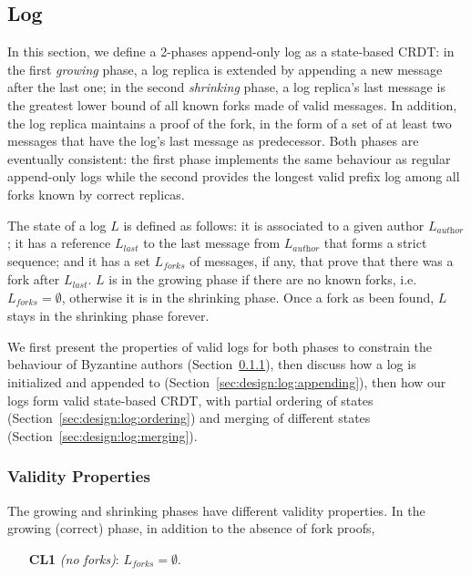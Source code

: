 \documentclass[9pt, oneside]{article}   	%
\begin{document}
\subsection{Log}
\label{sec:design:log}

In this section, we define a 2-phases append-only log as a state-based CRDT: in the first \textit{growing} phase, a log replica is extended by appending a new message after the last one; in the second \textit{shrinking} phase, a log replica's last message is the greatest lower bound of all known forks made of valid messages. In addition, the log replica maintains a proof of the fork, in the form of a set of at least two messages that have the log's last message as predecessor. Both phases are eventually consistent: the first phase implements the same behaviour as regular append-only logs while the second  provides the longest valid prefix log among all forks known by correct replicas.

The state of a log $L$ is defined as follows: it is associated to a given author $L_\textit{author}$; it has a reference $L_\textit{last}$ to the last message from $L_\textit{author}$ that forms a strict sequence; and it has a set $L_\textit{forks}$ of messages, if any, that prove that there was a fork after $L_\textit{last}$. $L$ is in the growing phase if there are no known forks, i.e. $L_\textit{forks} = \emptyset$, otherwise it is in the shrinking phase. Once a fork as been found, $L$ stays in the shrinking phase forever. 

We first present the properties of valid logs for both phases to constrain the behaviour of Byzantine authors (Section~\ref{sec:design:log:validity}), then discuss how a log is initialized and appended to (Section~\ref{sec:design:log:appending}), then how our logs form valid state-based CRDT, with partial ordering of states (Section~\ref{sec:design:log:ordering}) and merging of different states (Section~\ref{sec:design:log:merging}). 

\subsubsection{Validity Properties}
\label{sec:design:log:validity}

The growing and shrinking phases have different validity properties. In the growing (correct) phase, in addition to the absence of fork proofs,
\begin{tcolorbox}
\begin{enumerate}
	\item[\textbf{CL1}] \textit{(no forks)}: $L_\textit{forks} = \emptyset$.
\end{enumerate}
\end{tcolorbox}
\end{document}
